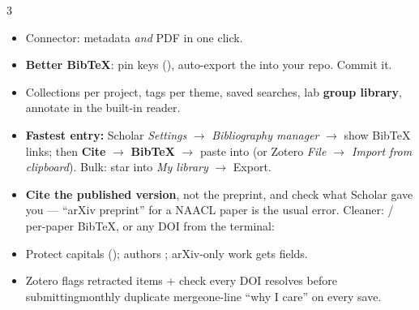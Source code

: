 \documentclass[10pt,a4paper]{article}
\begin{document}
\begin{multicols}{3}
\begin{itemize}
  \item Connector: metadata \emph{and} PDF in one click.
  \item \textbf{Better BibTeX}: pin keys (), auto-export
        the  into your repo. Commit it.
  \item Collections per project, tags per theme, saved searches, lab
        \textbf{group library}, annotate in the built-in reader.
  \item \textbf{Fastest entry:} Scholar \emph{Settings} $\to$
        \emph{Bibliography manager} $\to$ show BibTeX links; then
        \textbf{Cite} $\to$ \textbf{BibTeX} $\to$ paste into 
        (or Zotero \emph{File $\to$ Import from clipboard}). Bulk: star into
        \emph{My library} $\to$ Export.
  \item \textbf{Cite the published version}, not the preprint, and check what
        Scholar gave you --- ``arXiv preprint'' for a NAACL paper is the usual
        error. Cleaner:  /
         per-paper BibTeX, or any DOI from the
        terminal:\\ 
  \item Protect capitals (); authors ; arXiv-only work gets  fields.
  \item Zotero flags retracted items\dt {} + check every DOI
        resolves before submitting\dt monthly duplicate merge\dt one-line
        ``why I care'' on every save.
\end{itemize}


\end{multicols}
\end{document}
